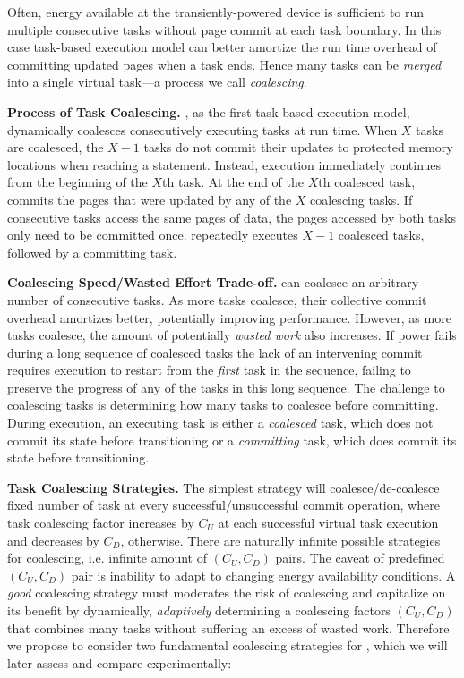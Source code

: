 Often, energy available at the transiently-powered device is sufficient to run multiple consecutive tasks without page commit at each task boundary. In this case task-based execution model can better amortize the run time overhead of committing updated pages when a task ends. Hence many tasks can be \emph{merged} into a single virtual task---a process we call \emph{coalescing}. 

\textbf{Process of Task Coalescing.} \sys, as the first task-based execution model, dynamically coalesces consecutively executing tasks at run time. When $X$ tasks are coalesced, the $X-1$ tasks do not commit their updates to protected memory locations when reaching a \transition statement. Instead, execution immediately continues from the beginning of the $X$th task. At the end of the $X$th coalesced task, \sys commits the pages that were updated by any of the $X$ coalescing tasks. If consecutive tasks access the same pages of data, the pages accessed by both tasks only need to be committed once. \sys repeatedly executes $X-1$ coalesced tasks, followed by a committing task. 

\textbf{Coalescing Speed/Wasted Effort Trade-off.} \sys can coalesce an arbitrary number of consecutive tasks. As more tasks coalesce, their collective commit overhead amortizes better, potentially improving performance. However, as more tasks coalesce, the amount of potentially {\em wasted work} also increases. If power fails during a long sequence of coalesced tasks the lack of an intervening commit requires execution to restart from the {\em first} task in the sequence, failing to preserve the progress of any of the tasks in this long sequence. The challenge to coalescing tasks is determining how many tasks to coalesce before committing. During execution, an executing task is either a {\em coalesced} task, which does not commit its state before transitioning or a {\em committing} task, which does commit its state before transitioning.

\textbf{Task Coalescing Strategies.} The simplest strategy will coalesce/de-coalesce fixed number of task at every successful/unsuccessful commit operation, where task coalescing factor increases by $C_U$ at each successful virtual task execution and decreases by $C_D$, otherwise. There are naturally infinite possible strategies for coalescing, i.e. infinite amount of $(C_U,C_D)$ pairs. The caveat of predefined $(C_U,C_D)$ pair is inability to adapt to changing energy availability conditions. A \emph{good} coalescing strategy must moderates the risk of coalescing and capitalize on its benefit by dynamically, \emph{adaptively} determining a coalescing factors $(C_U,C_D)$ that combines many tasks without suffering an excess of wasted work. Therefore we propose to consider two fundamental coalescing strategies for \sys, which we will later assess and compare experimentally:

